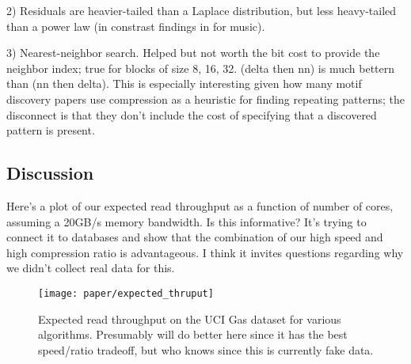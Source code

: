 2) Residuals are heavier-tailed than a Laplace distribution, but less heavy-tailed than a power law (in constrast findings in \cite{shorten} for music).

3) Nearest-neighbor search. Helped but not worth the bit cost to provide the neighbor index; true for blocks of size 8, 16, 32. (delta then nn) is much bettern than (nn then delta). This is especially interesting given how many motif discovery papers use compression as a heuristic for finding repeating patterns; the disconnect is that they don't include the cost of specifying that a discovered pattern is present.


\subsection{Discussion}

Here's a plot of our expected read throughput as a function of number of cores, assuming a 20GB/s memory bandwidth. Is this informative? It's trying to connect it to databases and show that the combination of our high speed and high compression ratio is advantageous. I think it invites questions regarding why we didn't collect real data for this.

\begin{figure}[h]
\begin{center}
    \texttt{[image: paper/expected\_thruput]}
    \caption{Expected read throughput on the UCI Gas dataset for various algorithms. Presumably \minesp will do better here since it has the best speed/ratio tradeoff, but who knows since this is currently fake data.}
    \label{fig:expected_thruput}
\end{center}
\end{figure}
